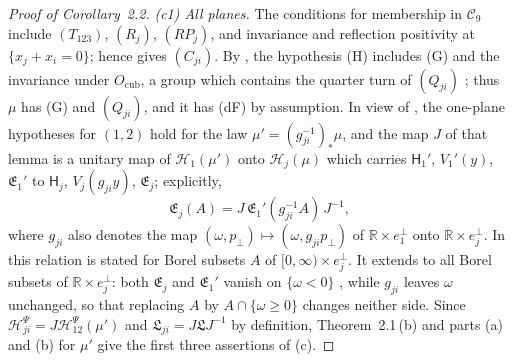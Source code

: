 \documentclass[11pt,letterpaper,reqno]{amsart}
\theoremstyle{definition}
\begin{document}
\begin{proof}[Proof of Corollary~2.2]
\emph{(c1) All planes.}
The conditions for membership in $\mathcal C_9$ include $(T_{123})$, $(R_j)$, $(RP_j)$, and invariance and reflection positivity at $\{x_j+x_i=0\}$; hence \cite[Theorem~12.21\,(c)]{QEDII} gives $(C_{ji})$.
By \cite[Definition~2.38]{QEDII}, the hypothesis (H) includes (G) and the invariance under $O_{\mathrm{cub}}$, a group which contains the quarter turn of $(Q_{ji})$ \cite[Definition~14.1]{QEDII}; thus $\mu$ has (G) and $(Q_{ji})$, and it has (dF) by assumption.
In view of \cite[Lemma~14.12\,(d)]{QEDII}, the one-plane hypotheses for $(1,2)$ hold for the law $\mu'=(g_{ji}^{-1})_*\mu$, and the map $J$ of that lemma is a unitary map of $\mathcal H_1(\mu')$ onto $\mathcal H_j(\mu)$ which carries $\mathsf H_1'$, $V_1'(y)$, $\mathfrak E_1'$ to $\mathsf H_j$, $V_j(g_{ji}y)$, $\mathfrak E_j$; explicitly,
\begin{equation*}
\mathfrak E_j(A)=J\,\mathfrak E_1'(g_{ji}^{-1}A)\,J^{-1},
\end{equation*}
where $g_{ji}$ also denotes the map $(\omega,p_\perp)\mapsto(\omega,g_{ji}p_\perp)$ of $\mathbb R\times e_1^\perp$ onto $\mathbb R\times e_j^\perp$.
In \cite[Lemma~14.12\,(d)]{QEDII} this relation is stated for Borel subsets $A$ of $[0,\infty)\times e_j^\perp$.
It extends to all Borel subsets of $\mathbb R\times e_j^\perp$: both $\mathfrak E_j$ and $\mathfrak E_1'$ vanish on $\{\omega<0\}$ \cite[Lemma~12.18\,(b)]{QEDII}, while $g_{ji}$ leaves $\omega$ unchanged, so that replacing $A$ by $A\cap\{\omega\ge0\}$ changes neither side.
Since $\mathcal H^{\Psi}_{ji}=J\mathcal H^{\Psi}_{12}(\mu')$ and $\mathfrak L_{ji}=J\mathfrak LJ^{-1}$ by definition, Theorem~2.1\,(b) and parts (a) and (b) for $\mu'$ give the first three assertions of (c).


\end{proof}
\end{document}
